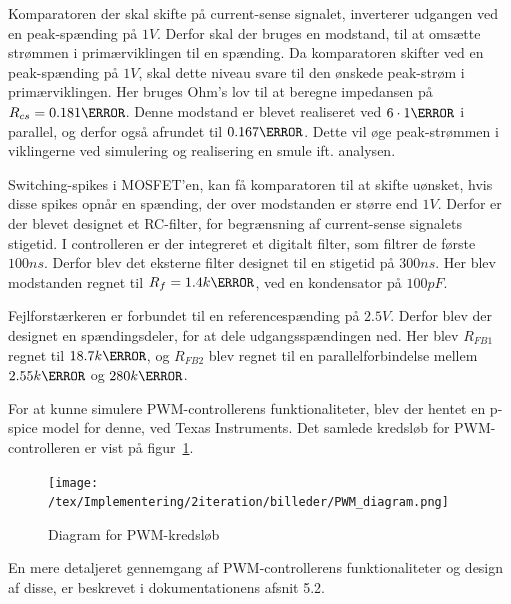 Komparatoren der skal skifte på current-sense signalet, inverterer udgangen ved en peak-spænding på $1V$. Derfor skal der bruges en modstand, til at omsætte strømmen i primærviklingen til en spænding. Da komparatoren skifter ved en peak-spænding på $1V$, skal dette niveau svare til den ønskede peak-strøm i primærviklingen. Her bruges Ohm's lov til at beregne impedansen på $R_{cs} = 0.181\ohm$. Denne modstand er blevet realiseret ved $6\cdot 1\ohm$ i parallel, og derfor også afrundet til $0.167\ohm$. Dette vil øge peak-strømmen i viklingerne ved simulering og realisering en smule ift. analysen. 

Switching-spikes i MOSFET'en, kan få komparatoren til at skifte uønsket, hvis disse spikes opnår en spænding, der over modstanden er større end $1V$. Derfor er der blevet designet et RC-filter, for begrænsning af current-sense signalets stigetid. I controlleren er der integreret et digitalt filter, som filtrer de første $100ns$. Derfor blev det eksterne filter designet til en stigetid på $300ns$. Her blev modstanden regnet til $R_f = 1.4k\ohm$, ved en kondensator på $100pF$.

Fejlforstærkeren er forbundet til en referencespænding på $2.5V$. Derfor blev der designet en spændingsdeler, for at dele udgangsspændingen ned. Her blev $R_{FB1}$ regnet til $18.7k\ohm$, og $R_{FB2}$ blev regnet til en parallelforbindelse mellem $2.55k\ohm$ og $280k\ohm$. 


For at kunne simulere PWM-controllerens funktionaliteter, blev der hentet en p-spice model for denne, ved Texas Instruments\cite{ucc1801-pspice}. Det samlede kredsløb for PWM-controlleren er vist på figur~\ref{fig:PWM_sim_diagram}.

\begin{figure}[H]
	\centering
	\texttt{[image: /tex/Implementering/2iteration/billeder/PWM\_diagram.png]}
	\caption{Diagram for PWM-kredsløb}
	\label{fig:PWM_sim_diagram}
\end{figure} 

\noindent En mere detaljeret gennemgang af PWM-controllerens funktionaliteter og design af disse, er beskrevet i dokumentationens afsnit 5.2.

